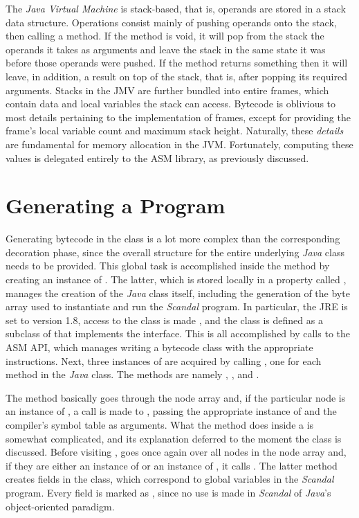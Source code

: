 The \emph{Java Virtual Machine} is stack-based, that is, operands are stored in a stack data structure. Operations consist mainly of pushing operands onto the stack, then calling a method. If the method is void, it will pop from the stack the operands it takes as arguments and leave the stack in the same state it was before those operands were pushed. If the method returns something then it will leave, in addition, a result on top of the stack, that is, after popping its required arguments. Stacks in the JMV are further bundled into entire frames, which contain data and local variables the stack can access. Bytecode is oblivious to most details pertaining to the implementation of frames, except for providing the frame's local variable count and maximum stack height. Naturally, these \emph{details} are fundamental for memory allocation in the JVM. Fortunately, computing these values is delegated entirely to the ASM library, as previously discussed.

\section{Generating a Program}

Generating bytecode in the  class is a lot more complex than the corresponding decoration phase, since the overall structure for the entire underlying \emph{Java} class needs to be provided. This global task is accomplished inside the  method by creating an instance of . The latter, which is stored locally in a property called , manages the creation of the \emph{Java} class itself, including the generation of the byte array used to instantiate and run the \emph{Scandal} program. In particular, the JRE is set to version 1.8, access to the class is made , and the class is defined as a subclass of  that implements the  interface. This is all accomplished by calls to the ASM API, which manages writing a bytecode class with the appropriate instructions. Next, three instances of  are acquired by calling , one for each method in the \emph{Java} class. The methods are namely , , and .

The  method basically goes through the node array and, if the particular node is an instance of , a call is made to , passing the appropriate instance of  and the compiler's symbol table as arguments. What the  method does inside a  is somewhat complicated, and its explanation deferred to the moment the  class is discussed. Before visiting ,  goes once again over all nodes in the node array and, if they are either an instance of  or an instance of , it calls . The latter method creates fields in the  class, which correspond to global variables in the \emph{Scandal} program. Every field is marked as , since no use is made in \emph{Scandal} of \emph{Java}'s object-oriented paradigm.


